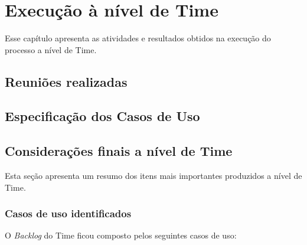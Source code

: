 \chapter{Execução à nível de Time}

  Esse capítulo apresenta as atividades e resultados obtidos na execução do processo a nível de Time.
  
  \section{Reuniões realizadas}
  
  
  \section{Especificação dos Casos de Uso}
 
  
  
  \section{Considerações finais a nível de Time}
    
    Esta seção apresenta um resumo dos itens mais importantes produzidos a nível de Time.
    
    \subsection{Casos de uso identificados} 
      
      O \textit{Backlog} do Time ficou composto pelos seguintes casos de uso:
      
      